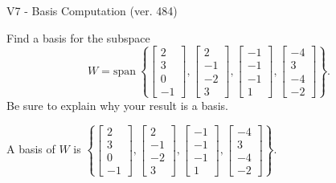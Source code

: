 \begin{exercise}
  \begin{exerciseTitle}V7 - Basis Computation (ver. 484)\end{exerciseTitle}
  \begin{exerciseStatement}
    Find a basis for the subspace 
\[W=\mathrm{span}\ \left\{\left[\begin{array}{r}
2 \\
3 \\
0 \\
-1
\end{array}\right] , \left[\begin{array}{r}
2 \\
-1 \\
-2 \\
3
\end{array}\right] , \left[\begin{array}{r}
-1 \\
-1 \\
-1 \\
1
\end{array}\right] , \left[\begin{array}{r}
-4 \\
3 \\
-4 \\
-2
\end{array}\right]\right\}.\]
 Be sure to explain why your result is a basis.


  \end{exerciseStatement}
  \begin{exerciseAnswer}
   A basis of \(W\) is  \(\left\{\left[\begin{array}{r}
2 \\
3 \\
0 \\
-1
\end{array}\right] , \left[\begin{array}{r}
2 \\
-1 \\
-2 \\
3
\end{array}\right] , \left[\begin{array}{r}
-1 \\
-1 \\
-1 \\
1
\end{array}\right] , \left[\begin{array}{r}
-4 \\
3 \\
-4 \\
-2
\end{array}\right]\right\}\).
  


  \end{exerciseAnswer}
\end{exercise}